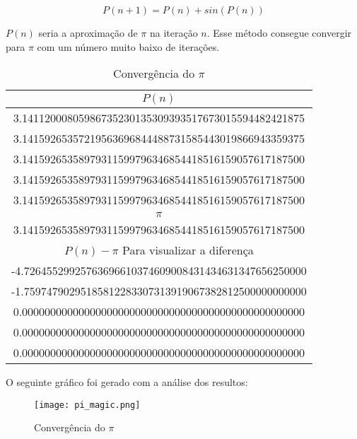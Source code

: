 			\begin{equation}
			\label{magic_equation}
				P(n+1) = P(n) + sin(P(n))
			\end{equation}

			$P(n)$ seria a aproximação de $\pi$ na iteração $n$. Esse método
			consegue convergir para $\pi$ com um número muito baixo de
			iterações.

			\begin{table}[H]
				\centering
				\begin{tabular}{|c|}
					\hline
					$P(n)$ \\
					\hline
					3.14112000805986735230135309393517673015594482421875 \\
					\hline
					3.14159265357219563696844488731585443019866943359375 \\
					\hline
					3.14159265358979311599796346854418516159057617187500 \\
					\hline
					3.14159265358979311599796346854418516159057617187500 \\
					\hline
					3.14159265358979311599796346854418516159057617187500 \\
					\hline
					\hline
					$\pi$ \\
					\hline
					3.14159265358979311599796346854418516159057617187500 \\
					\hline
					\hline
					$P(n) - \pi$  Para visualizar a diferença \\
					\hline
					-4.72645529925763696610374609008431434631347656250000 \\
					\hline
					-1.75974790295185812283307313919067382812500000000000 \\
					\hline
					0.00000000000000000000000000000000000000000000000000 \\
					\hline
					0.00000000000000000000000000000000000000000000000000 \\
					\hline
					0.00000000000000000000000000000000000000000000000000 \\
					\hline
				\end{tabular}
				\label{pi_magic}
				\caption{Convergência do $\pi$}
			\end{table}

			O seguinte gráfico foi gerado com a análise dos resultos:

			\begin{figure}[H]
				\centering
				\texttt{[image: pi\_magic.png]}
				\caption{Convergência do $\pi$}
				\label{fig:pi-magic}
			\end{figure}

